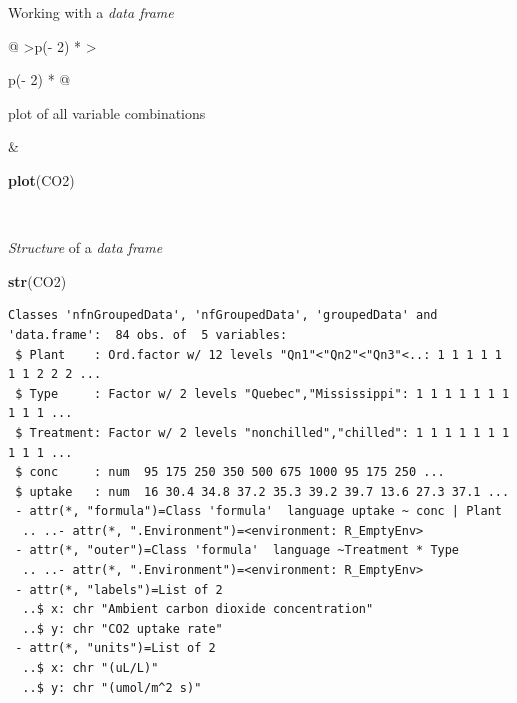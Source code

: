 \documentclass[
  11pt,
  ignorenonframetext,
]{beamer}
\newenvironment{Shaded}{\begin{snugshade}}{\end{snugshade}}
\newcommand{\FunctionTok}[1]{\textcolor[rgb]{0.13,0.29,0.53}{\textbf{#1}}}
\newcommand{\NormalTok}[1]{#1}
\begin{document}
\begin{frame}{Working with a \emph{data frame}}
\begin{longtable}[]{@{}
  >{\raggedleft\arraybackslash}p{(\columnwidth - 2\tabcolsep) * }
  >{\raggedright\arraybackslash}p{(\columnwidth - 2\tabcolsep) * }@{}}
\begin{minipage}[t]{\linewidth}
plot of all variable combinations
\end{minipage} & \begin{minipage}[t]{\linewidth}\raggedright
\begin{Shaded}
\begin{Highlighting}[]
\FunctionTok{plot}\NormalTok{(CO2)}
\end{Highlighting}
\end{Shaded}
\end{minipage} \\
\bottomrule\noalign{}
\end{longtable}
\end{frame}

\begin{frame}{\emph{Structure} of a \emph{data frame}}
\protect\hypertarget{structure-of-a-data-frame}{}
\hfill{}

\begin{Shaded}
\begin{Highlighting}[]
\FunctionTok{str}\NormalTok{(CO2)}
\end{Highlighting}
\end{Shaded}

\begin{verbatim}
Classes 'nfnGroupedData', 'nfGroupedData', 'groupedData' and 'data.frame':  84 obs. of  5 variables:
 $ Plant    : Ord.factor w/ 12 levels "Qn1"<"Qn2"<"Qn3"<..: 1 1 1 1 1 1 1 2 2 2 ...
 $ Type     : Factor w/ 2 levels "Quebec","Mississippi": 1 1 1 1 1 1 1 1 1 1 ...
 $ Treatment: Factor w/ 2 levels "nonchilled","chilled": 1 1 1 1 1 1 1 1 1 1 ...
 $ conc     : num  95 175 250 350 500 675 1000 95 175 250 ...
 $ uptake   : num  16 30.4 34.8 37.2 35.3 39.2 39.7 13.6 27.3 37.1 ...
 - attr(*, "formula")=Class 'formula'  language uptake ~ conc | Plant
  .. ..- attr(*, ".Environment")=<environment: R_EmptyEnv> 
 - attr(*, "outer")=Class 'formula'  language ~Treatment * Type
  .. ..- attr(*, ".Environment")=<environment: R_EmptyEnv> 
 - attr(*, "labels")=List of 2
  ..$ x: chr "Ambient carbon dioxide concentration"
  ..$ y: chr "CO2 uptake rate"
 - attr(*, "units")=List of 2
  ..$ x: chr "(uL/L)"
  ..$ y: chr "(umol/m^2 s)"
\end{verbatim}


\hfill\break
\hfill\break
\hfill\break
\hfill\break
\hfill\break
\hfill\break
\end{frame}
\end{document}

